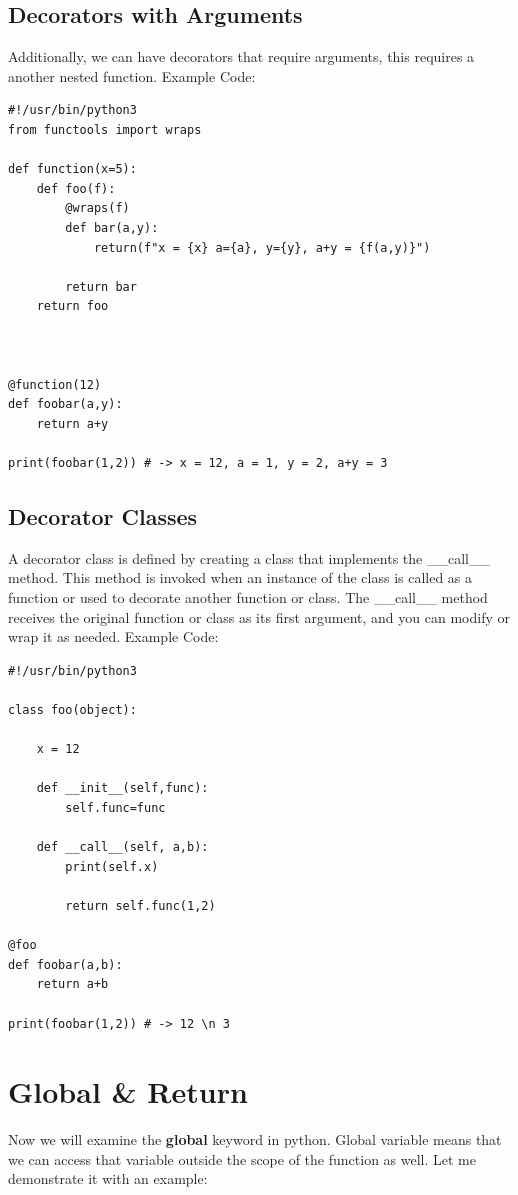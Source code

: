 \documentclass{report}
\begin{document}
    \subsection{Decorators with Arguments}
    \bigbreak \noindent
    Additionally, we can have decorators that require arguments, this requires a another nested function.
    \bigbreak \noindent 
    Example Code:
    \begin{verbatim}
#!/usr/bin/python3
from functools import wraps

def function(x=5):
    def foo(f):
        @wraps(f)
        def bar(a,y):
            return(f"x = {x} a={a}, y={y}, a+y = {f(a,y)}")

        return bar
    return foo



@function(12)
def foobar(a,y):
    return a+y

print(foobar(1,2)) # -> x = 12, a = 1, y = 2, a+y = 3
    \end{verbatim}

    \bigbreak \noindent \bigbreak \noindent 
    \subsection{Decorator Classes}
    A decorator class is defined by creating a class that implements the \_\_call\_\_ method. This method is invoked when an instance of the class is called as a function or used to decorate another function or class. The \_\_call\_\_ method receives the original function or class as its first argument, and you can modify or wrap it as needed.
    \bigbreak \noindent 
    Example Code:
    \begin{verbatim}
#!/usr/bin/python3

class foo(object):

    x = 12

    def __init__(self,func):
        self.func=func

    def __call__(self, a,b):
        print(self.x)

        return self.func(1,2)

@foo
def foobar(a,b):
    return a+b

print(foobar(1,2)) # -> 12 \n 3
    \end{verbatim}

    \pagebreak \bigbreak \noindent \section{Global \& Return}
    \bigbreak \noindent
    Now we will examine the \textbf{global} keyword in python. Global variable means that we can access that variable outside the scope of the function as well. Let me demonstrate it with an example:
\end{document}
